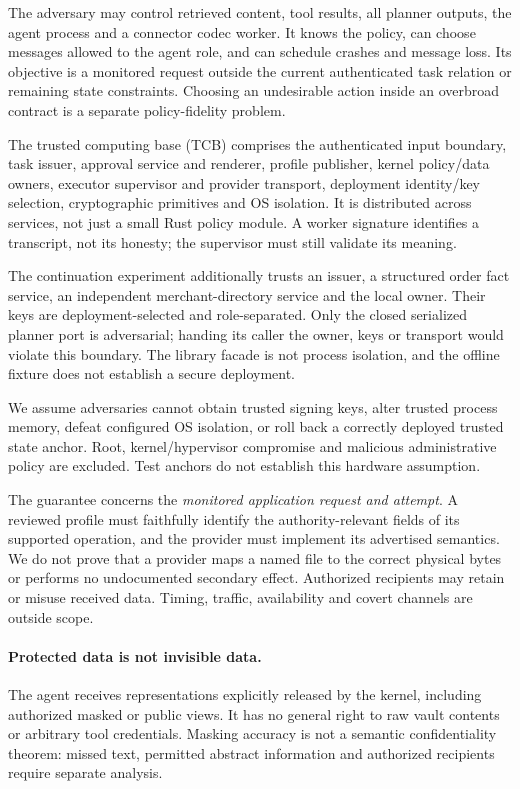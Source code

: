 \documentclass[letterpaper,twocolumn,10pt]{article}
\begin{document}
The adversary may control retrieved content, tool results, all planner outputs,
the agent process and a connector codec worker. It knows the policy, can
choose messages allowed to the agent role, and can schedule crashes and message
loss. Its objective is a monitored request outside the current authenticated
task relation or remaining state constraints. Choosing an undesirable action
inside an overbroad contract is a separate policy-fidelity problem.

The trusted computing base (TCB) comprises the authenticated input boundary,
task issuer, approval service and renderer, profile publisher,
kernel policy/data owners, executor supervisor and provider transport,
deployment identity/key selection, cryptographic primitives and OS isolation.
It is distributed across services, not just a small Rust policy module.
A worker signature identifies a transcript, not its honesty; the supervisor
must still validate its meaning.

The continuation experiment additionally trusts an issuer, a structured order
fact service, an independent merchant-directory service and the local owner.
Their keys are deployment-selected and role-separated. Only the closed
serialized planner port is adversarial; handing its caller the owner, keys or
transport would violate this boundary. The library facade is not process
isolation, and the offline fixture does not establish a secure deployment.

We assume adversaries cannot obtain trusted signing keys, alter trusted process
memory, defeat configured OS isolation, or roll back a correctly deployed trusted
state anchor. Root, kernel/hypervisor compromise and malicious administrative
policy are excluded. Test anchors do not establish this hardware assumption.

The guarantee concerns the \emph{monitored application request and attempt}.
A reviewed profile must faithfully identify the authority-relevant fields of
its supported operation, and the provider must implement its advertised semantics.
We do not prove that a provider maps a named file to the correct physical bytes
or performs no undocumented secondary effect. Authorized recipients may retain
or misuse received data. Timing, traffic, availability and covert channels are
outside scope.

\paragraph{Protected data is not invisible data.}
The agent receives representations explicitly released by the kernel, including
authorized masked or public views. It has no general right to raw vault contents
or arbitrary tool credentials. Masking accuracy is not a semantic confidentiality
theorem: missed text, permitted abstract information and authorized recipients
require separate analysis.
\end{document}
